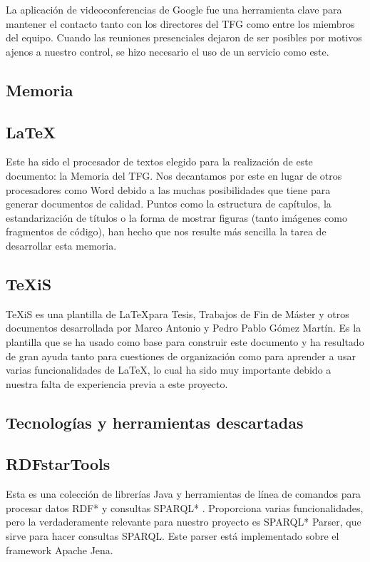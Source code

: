 La aplicación de videoconferencias de Google fue una herramienta clave para mantener el contacto tanto con los directores del TFG como entre los miembros del equipo. Cuando las reuniones presenciales dejaron de ser posibles por motivos ajenos a nuestro control, se hizo necesario el uso de un servicio como este.

\subsection{Memoria}

\subsection*{LaTeX}

Este ha sido el procesador de textos elegido para la realización de este documento: la Memoria del TFG. Nos decantamos por este en lugar de otros procesadores como Word debido a las muchas posibilidades que tiene para generar documentos de calidad. Puntos como la estructura de capítulos, la estandarización de títulos o la forma de mostrar figuras (tanto imágenes como fragmentos de código), han hecho que nos resulte más sencilla la tarea de desarrollar esta memoria.

\subsection*{TeXiS}

TeXiS es una plantilla de \LaTeX para Tesis, Trabajos de Fin de Máster y otros documentos desarrollada por Marco Antonio y Pedro Pablo Gómez Martín. Es la plantilla que se ha usado como base para construir este documento y ha resultado de gran ayuda tanto para cuestiones de organización como para aprender a usar varias funcionalidades de \LaTeX, lo cual ha sido muy importante debido a nuestra falta de experiencia previa a este proyecto.

\subsection{Tecnologías y herramientas descartadas}

\subsection*{RDFstarTools}

Esta es una colección de librerías Java y herramientas de línea de comandos para procesar datos RDF* y consultas SPARQL* \cite{rdfstartools}. Proporciona varias funcionalidades, pero la verdaderamente relevante para nuestro proyecto es SPARQL* Parser, que sirve para hacer consultas SPARQL. Este parser está implementado sobre el framework Apache Jena.\\


